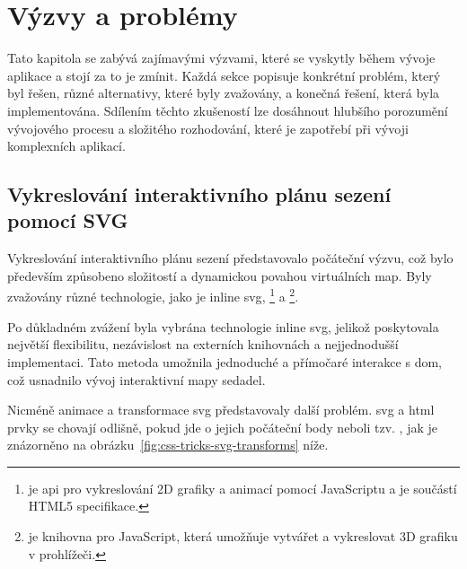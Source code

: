 \chapter{Výzvy a problémy}
\label{ch:vyzvy-a-problemy}
Tato kapitola se zabývá zajímavými výzvami, které se vyskytly během vývoje aplikace a stojí za to je zmínit.
Každá sekce popisuje konkrétní problém, který byl řešen, různé alternativy, které byly zvažovány, a konečná řešení, která byla implementována.
Sdílením těchto zkušeností lze dosáhnout hlubšího porozumění vývojového procesu a složitého rozhodování, které je zapotřebí při vývoji komplexních aplikací.

\section{Vykreslování interaktivního plánu sezení pomocí SVG}
\label{sec:vyzvy-a-problemy-rendering-sedadel}
Vykreslování interaktivního plánu sezení představovalo počáteční výzvu, což bylo především způsobeno složitostí a dynamickou povahou virtuálních map.
Byly zvažovány různé technologie, jako je inline \ac{svg}, \footnote{ je \ac{api} pro vykreslování 2D grafiky a animací pomocí JavaScriptu a je součástí HTML5 specifikace\cite{mdn_api_canvas_api}.} a \footnote{ je knihovna pro JavaScript, která umožňuje vytvářet a vykreslovat 3D grafiku v prohlížeči\cite{mdn_games_techniques_3d_on_the_web_building_up_a_basic_demo_with_three_js}.}.

Po důkladném zvážení byla vybrána technologie inline \ac{svg}, jelikož poskytovala největší flexibilitu, nezávislost na externích knihovnách a nejjednodušší implementaci\cite{s_blog_seating_plan_rendering}.
Tato metoda umožnila jednoduché a přímočaré interakce s \ac{dom}, což usnadnilo vývoj interaktivní mapy sedadel.

Nicméně animace a transformace \ac{svg} představovaly další problém.
\ac{svg} a \ac{html} prvky se chovají odlišně, pokud jde o jejich počáteční body neboli tzv. , jak je znázorněno na obrázku~\ref{fig:css-tricks-svg-transforms} níže.

